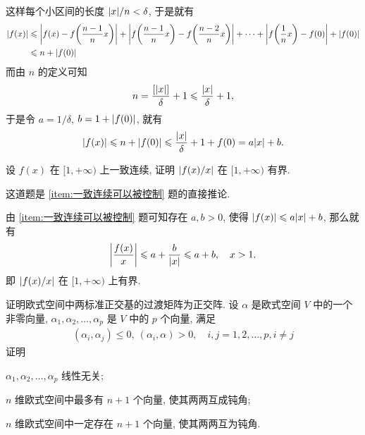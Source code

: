 \begin{exercise}[series=exer]
\begin{answer}
      这样每个小区间的长度 $ \abs{x}/n < \delta $, 于是就有
      \begin{align*}
          \abs{f(x)} & \leqslant \abs{f(x) - f\qty(\frac{n - 1}{n}x)} + \abs{f\qty(\frac{n - 1}{n}x) - f\qty(\frac{n - 2}{n}x)} + \dots + \abs{f\qty(\frac{1}{n}x) - f(0)} + \abs{f(0)}\\
          & \leqslant n + \abs{f(0)}
      \end{align*}
      而由 $ n $ 的定义可知
      \begin{align*}
          n = \frac{[\abs{x}]}{\delta} + 1 \leqslant \frac{\abs{x}}{\delta} + 1,
      \end{align*}
      于是令 $ a = 1/\delta $, $ b = 1 + \abs{f(0)} $, 就有
      \begin{align*}
          \abs{f(x)} \leqslant n + \abs{f(0)} \leqslant \frac{\abs{x}}{\delta} + 1 + f(0) = a\abs{x} + b.
      \end{align*}
  \end{answer}
  \item 设 $ f(x) $ 在 $ [1, +\infty) $ 上一致连续, 证明 $ \abs{f(x)/x} $ 在 $ [1, +\infty) $ 有界.
  \begin{hint}
      这道题是 \ref{item:一致连续可以被控制} 题的直接推论.
  \end{hint}
  \begin{answer}
      由 \ref{item:一致连续可以被控制} 题可知存在 $ a, b > 0 $, 使得 $ \abs{f(x)} \leqslant a\abs{x} + b $, 那么就有
      \begin{align*}
          \abs{\frac{f(x)}{x}} \leqslant a + \frac{b}{\abs{x}} \leqslant a + b,\quad x > 1.
      \end{align*}
      即 $ \abs{f(x)/x} $ 在 $ [1, +\infty) $ 上有界.
  \end{answer}
  \item 证明欧式空间中两标准正交基的过渡矩阵为正交阵.
  \hitem 设 $ \alpha $ 是欧式空间 $ V $ 中的一个非零向量, $ \alpha_{1}, \alpha_{2}, \dots, \alpha_{p} $ 是 $ V $ 中的 $ p $ 个向量, 满足
  \begin{align*}
      (\alpha_{i}, \alpha_{j}) \le 0,\ (\alpha_{i}, \alpha) > 0, \quad i, j = 1, 2, \dots, p, i \ne j
  \end{align*}
  证明
  \begin{exercise}
      \item\label{item:alphaalphap} $ \alpha_{1}, \alpha_{2}, \dots, \alpha_{p} $ 线性无关;
      \item $ n $ 维欧式空间中最多有 $ n + 1 $ 个向量, 使其两两互成钝角;
      \item $ n $ 维欧式空间中一定存在 $ n + 1 $ 个向量, 使其两两互为钝角.

\end{exercise}
\end{exercise}
